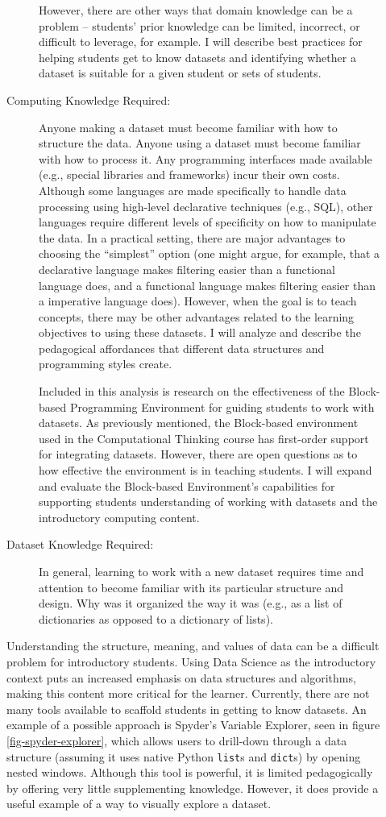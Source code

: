 \begin{description}
\begin{description}
		However, there are other ways that domain knowledge can be a problem -- students' prior knowledge can be limited, incorrect, or difficult to leverage, for example. I will describe best practices for helping students get to know datasets and identifying whether a dataset is suitable for a given student or sets of students.
		\item[Computing Knowledge Required:] Anyone making a dataset must become familiar with how to structure the data. Anyone using a dataset must become familiar with how to process it. Any programming interfaces made available (e.g., special libraries and frameworks) incur their own costs. Although some languages are made specifically to handle data processing using high-level declarative techniques (e.g., SQL), other languages require different levels of specificity on how to manipulate the data. In a practical setting, there are major advantages to choosing the ``simplest'' option (one might argue, for example, that a declarative language makes filtering easier than a functional language does, and a functional language makes filtering easier than a imperative language does). However, when the goal is to teach concepts, there may be other advantages related to the learning objectives to using these datasets. I will analyze and describe the pedagogical affordances that different data structures and programming styles create.
		
		Included in this analysis is research on the effectiveness of the Block-based Programming Environment for guiding students to work with datasets.
		As previously mentioned, the Block-based environment used in the Computational Thinking course has first-order support for integrating datasets. However, there are open questions as to how effective the environment is in teaching students.
		I will expand and evaluate the Block-based Environment's capabilities for supporting students understanding of working with datasets and the introductory computing content.
		
		\item[Dataset Knowledge Required:] In general, learning to work with a new dataset requires time and attention to become familiar with its particular structure and design. Why was it organized the way it was (e.g., as a list of dictionaries as opposed to a dictionary of lists).
	\end{description}
		Understanding the structure, meaning, and values of data can be a difficult problem for introductory students.
		Using Data Science as the introductory context puts an increased emphasis on data structures and algorithms, making this content more critical for the learner.
		Currently, there are not many tools available to scaffold students in getting to know datasets.
		An example of a possible approach is Spyder's Variable Explorer, seen in figure \ref{fig-spyder-explorer}, which allows users to drill-down through a data structure (assuming it uses native Python \texttt{list}s and \texttt{dict}s) by opening nested windows. 
		Although this tool is powerful, it is limited pedagogically by offering very little supplementing knowledge.
		However, it does provide a useful example of a way to visually explore a dataset.


\end{description}
